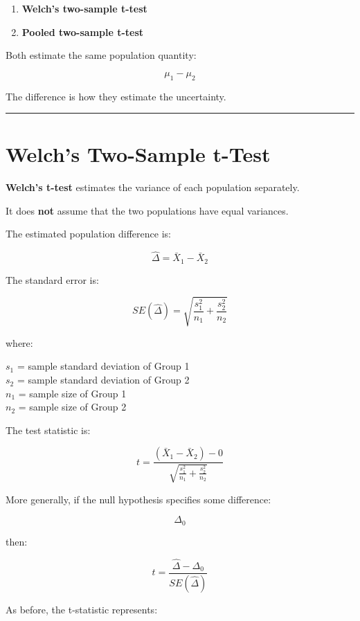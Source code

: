 \documentclass[
  letterpaper,
  DIV=11,
  numbers=noendperiod]{scrreprt}
\providecommand{\tightlist}{%
  \setlength{\itemsep}{0pt}\setlength{\parskip}{0pt}}
\begin{document}
\begin{enumerate}
\def\labelenumi{\arabic{enumi}.}
\tightlist
\item
  \textbf{Welch's two-sample t-test}
\item
  \textbf{Pooled two-sample t-test}
\end{enumerate}

Both estimate the same population quantity:

\[
\mu_1-\mu_2
\]

The difference is how they estimate the uncertainty.

\begin{center}\rule{0.5\linewidth}{0.5pt}\end{center}


\chapter{Welch's Two-Sample t-Test}\label{welchs-two-sample-t-test}

\textbf{Welch's t-test} estimates the variance of each population
separately.

It does \textbf{not} assume that the two populations have equal
variances.

The estimated population difference is:

\[
\hat{\Delta}
=
\bar{X}_1-\bar{X}_2
\]

The standard error is:

\[
\boxed{
SE(\hat{\Delta})
=
\sqrt{
\frac{s_1^2}{n_1}
+
\frac{s_2^2}{n_2}
}
}
\]

where:

\(s_1\) = sample standard deviation of Group 1\\
\(s_2\) = sample standard deviation of Group 2\\
\(n_1\) = sample size of Group 1\\
\(n_2\) = sample size of Group 2

The test statistic is:

\[
\boxed{
t=
\frac{
(\bar{X}_1-\bar{X}_2)-0
}{
\sqrt{
\frac{s_1^2}{n_1}
+
\frac{s_2^2}{n_2}
}
}
}
\]

More generally, if the null hypothesis specifies some difference:

\[
\Delta_0
\]

then:

\[
t=
\frac{
\hat{\Delta}-\Delta_0
}{
SE(\hat{\Delta})
}
\]

As before, the t-statistic represents:
\end{document}
